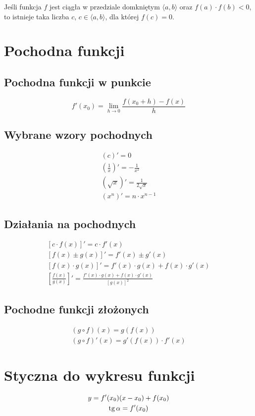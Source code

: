\begin{theorem}
  Jeśli funkcja $f$ jest ciągła w przedziale domkniętym $\langle a, b\rangle$ oraz $f(a) \cdot f(b)
  < 0$, to istnieje taka liczba $c$, $c \in \langle a, b\rangle$, dla której $f(c) = 0$.
\end{theorem}

\section{Pochodna funkcji}
\subsection{Pochodna funkcji w punkcie}
\begin{equation*}
  f'(x_0) = \lim_{h \to 0} \frac{f(x_0 + h) - f(x)}{h}
\end{equation*}

\subsection{Wybrane wzory pochodnych}
\begin{gather*}
  (c)' = 0\\
  \left(\frac 1 x\right)' = -\frac{1}{x^2}\\
  \left(\sqrt x\right)' = \frac{1}{2 \sqrt x}\\
  \left(x^n\right)' = n \cdot x^{n-1}
\end{gather*}

\subsection{Działania na pochodnych}
\begin{gather*}
  \left[c \cdot f(x)\right]' = c \cdot f'(x)\\
  \left[f(x) \pm g(x)\right]' = f'(x) \pm g'(x)\\
  \left[f(x) \cdot g(x)\right]' = f'(x) \cdot g(x) + f(x) \cdot g'(x)\\
  \left[\frac{f(x)}{g(x)}\right]' = \frac{f'(x) \cdot g(x) + f(x) \cdot  g'(x)}{\left[g(x)\right]^2}
\end{gather*}

\subsection{Pochodne funkcji złożonych}
\begin{gather*}
  (g \circ f)(x) = g(f(x))\\
  (g \circ f)'(x) = g'(f(x)) \cdot f'(x)
\end{gather*}

\section{Styczna do wykresu funkcji}
\begin{gather*}
  y = f'(x_0)(x - x_0) + f(x_0)\\
  \operatorname{tg} \alpha = f'(x_0)
\end{gather*}

